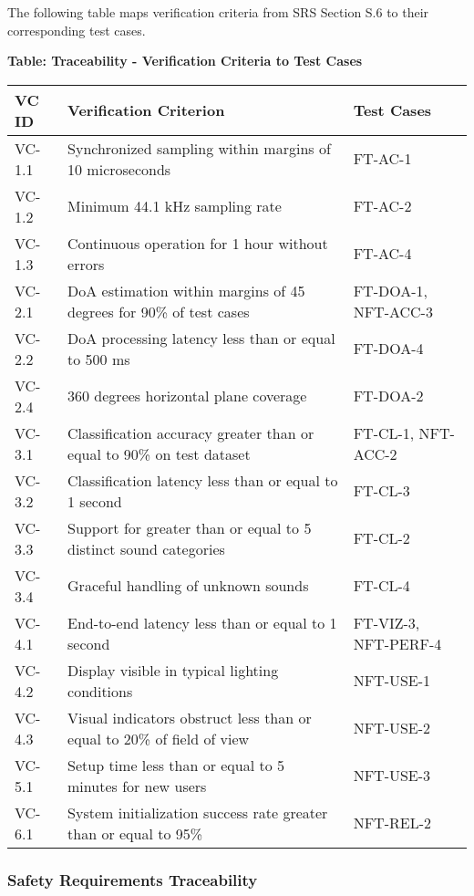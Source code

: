 \documentclass[12pt, titlepage]{article}
\begin{document}
The following table maps verification criteria from SRS Section S.6 to their
corresponding test cases.

\noindent
\textbf{Table: Traceability - Verification Criteria to Test Cases}

\noindent
\begin{tabular}{|p{3cm}|p{8cm}|p{3cm}|}
\hline
\textbf{VC ID} & \textbf{Verification Criterion} & \textbf{Test Cases} \\
\hline
VC-1.1 & Synchronized sampling within margins of 10 microseconds & FT-AC-1 \\
\hline
VC-1.2 & Minimum 44.1 kHz sampling rate & FT-AC-2 \\
\hline
VC-1.3 & Continuous operation for 1 hour without errors & FT-AC-4 \\
\hline
VC-2.1 & DoA estimation within margins of 45 degrees for 90\% of test cases & FT-DOA-1, NFT-ACC-3 \\
\hline
VC-2.2 & DoA processing latency less than or equal to 500 ms & FT-DOA-4 \\
\hline
VC-2.4 & 360 degrees horizontal plane coverage & FT-DOA-2 \\
\hline
VC-3.1 & Classification accuracy greater than or equal to 90\% on test dataset & FT-CL-1, NFT-ACC-2 \\
\hline
VC-3.2 & Classification latency less than or equal to 1 second & FT-CL-3 \\
\hline
VC-3.3 & Support for greater than or equal to 5 distinct sound categories & FT-CL-2 \\
\hline
VC-3.4 & Graceful handling of unknown sounds & FT-CL-4 \\
\hline
VC-4.1 & End-to-end latency less than or equal to 1 second & FT-VIZ-3, NFT-PERF-4 \\
\hline
VC-4.2 & Display visible in typical lighting conditions & NFT-USE-1 \\
\hline
VC-4.3 & Visual indicators obstruct less than or equal to 20\% of field of view & NFT-USE-2 \\
\hline
VC-5.1 & Setup time less than or equal to 5 minutes for new users & NFT-USE-3 \\
\hline
VC-6.1 & System initialization success rate greater than or equal to 95\% & NFT-REL-2 \\
\hline
\end{tabular}

\subsubsection{Safety Requirements Traceability}
\end{document}
